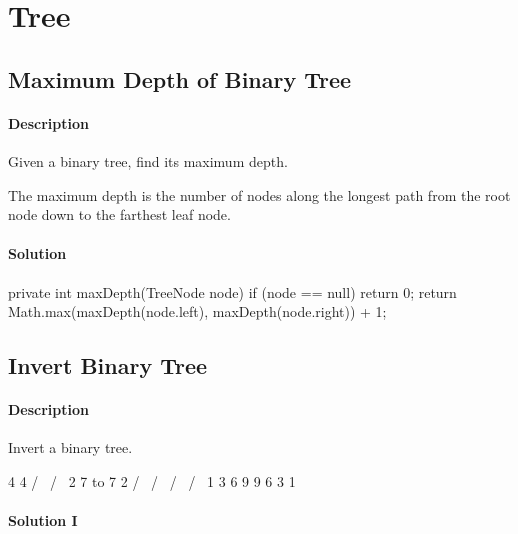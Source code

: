 \chapter{Tree}

\section{Maximum Depth of Binary Tree} %

\subsubsection{Description}

Given a binary tree, find its maximum depth.

The maximum depth is the number of nodes along the longest path from the root node down to the farthest leaf node.

\subsubsection{Solution}

\begin{Code}
private int maxDepth(TreeNode node) {
    if (node == null) {
        return 0;
    }
    return Math.max(maxDepth(node.left), maxDepth(node.right)) + 1;
}
\end{Code}

\newpage

\section{Invert Binary Tree} %

\subsubsection{Description}

Invert a binary tree.
\begin{Code}
     4                              4
   /   \                          /   \
  2     7           to           7     2
 / \   / \                      / \   / \
1   3 6   9                    9   6 3   1
\end{Code}

\subsubsection{Solution I}

